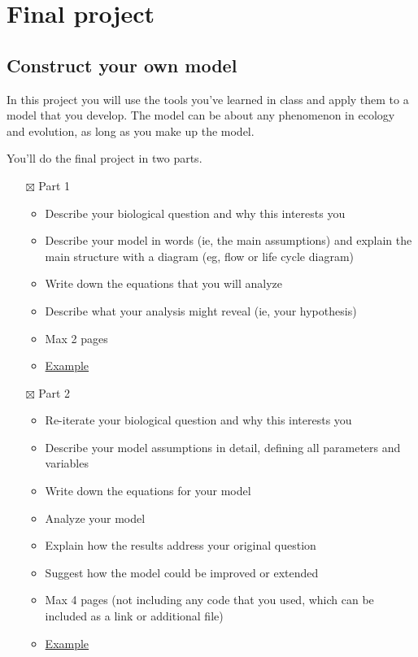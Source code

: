\documentclass[
]{article}
\providecommand{\tightlist}{%
  \setlength{\itemsep}{0pt}\setlength{\parskip}{0pt}}
\begin{document}
\section{Final project}\label{final-project}

\subsection{Construct your own model}\label{construct-your-own-model}

In this project you will use the tools you've learned in class and apply
them to a model that you develop. The model can be about any phenomenon
in ecology and evolution, as long as you make up the model.

You'll do the final project in two parts.

\begin{itemize}
\tightlist
\item[$\boxtimes$]
  Part 1

  \begin{itemize}
  \tightlist
  \item
    Describe your biological question and why this interests you
  \item
    Describe your model in words (ie, the main assumptions) and explain
    the main structure with a diagram (eg, flow or life cycle diagram)
  \item
    Write down the equations that you will analyze
  \item
    Describe what your analysis might reveal (ie, your hypothesis)
  \item
    Max 2 pages
  \item
    \href{final_project/partI_example.md}{Example}
  \end{itemize}
\item[$\boxtimes$]
  Part 2

  \begin{itemize}
  \tightlist
  \item
    Re-iterate your biological question and why this interests you
  \item
    Describe your model assumptions in detail, defining all parameters
    and variables
  \item
    Write down the equations for your model
  \item
    Analyze your model
  \item
    Explain how the results address your original question
  \item
    Suggest how the model could be improved or extended
  \item
    Max 4 pages (not including any code that you used, which can be
    included as a link or additional file)
  \item
    \href{final_project/partII_example.md}{Example}
  \end{itemize}
\end{itemize}
\end{document}

